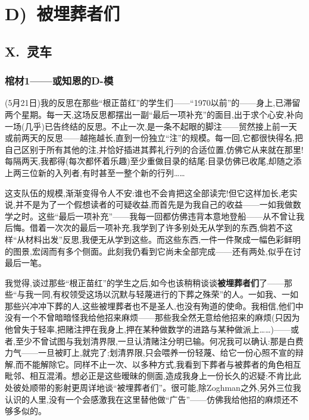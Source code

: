 
\chapter{D)~被埋葬者们}

\section{X.~灵车}

\subsection{棺材1——或知恩的D-模}


\dmark{}(5月21日)我的反思在那些“根正苗红”的学生们——“1970以前”的——身上,已滞留两个星期。每一天,这场反思都摆出一副“最后一项补充”的面目,出于求个心安,补向一场(几乎)已告终结的反思。不止一次,是一条不起眼的脚注——贸然接上前一天或前两天的反思——越拖越长,直到一份独立“注”的规模。每一回,它都很快得名,把自己区别于所有其他的注,并恰好插进其葬礼行列的合适位置,仿佛它从来就在那里!每隔两天,我都得(每次都怀着乐趣)至少重做目录的结尾:目录仿佛已收尾,却随之添上两三位新的入列者,有时甚至一整个新的行列……

这支队伍的规模,渐渐变得令人不安:谁也不会肯把这全部读完!但它这样加长,老实说,并不是为了一个假想读者的可疑收益,而首先是为我自己的收益——一如我做数学之时。这些“最后一项补充”——我每一回都仿佛违背本意地登船——从不曾让我后悔。借着一次次的最后一项补充,我学到了许多别处无从学到的东西,倘若不这样“从材料出发”反思,我便无从学到这些。而这些东西,一件一件聚成一幅色彩鲜明的图景,宏阔而有多个侧面。此刻我仍看到它尚未全部完成——还有两处,似乎在讨最后一笔。

我觉得,谈过那些“根正苗红”的学生之后,如今也该稍稍谈谈\textbf{被埋葬者们}了——那些“与我一同,有权领受这场以沉默与轻蔑进行的下葬之殊荣”的人。一如我、一如那些兴冲冲下葬的人,这些被埋葬者也不是圣人,也没有殉道的使命。我相信,他们中没有一个不曾暗暗怪我\dmark{}给他招来麻烦——那些我全然无意给他招来的麻烦(只因为他曾失于轻率,把赌注押在我身上,押在某种做数学的进路与某种做派上……)——或者,至少不曾试图与我划清界限,一旦认清赌注分明已输。何况我可以确认:那是白费力气——一旦被盯上,就完了;划清界限,只会喂养一份轻蔑、给它一份心照不宣的辩解,而不能解除它。同样不止一次、以多种方式,我看到下葬者与被葬者的角色相互毗邻、相互混淆。想必正是这些暧昧的侧面,造成我身上一份长久的迟疑:不肯比此处彼处顺带的影射更周详地谈“被埋葬者们”。很可能,除Zoghman之外,另外三位我认识的人里,没有一个会感激我在这里替他做“广告”——仿佛我给他招的麻烦还不够多似的。

